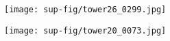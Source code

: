 \documentclass[10pt,twocolumn]{article}
\begin{document}
\begin{figure}[!hbtp]
    \centering
    \begin{subfigure}[b]{0.48\linewidth}
      \texttt{[image: sup-fig/tower26\_0299.jpg]}
     \end{subfigure}
     \GAP
         \begin{subfigure}[b]{0.48\linewidth}
      \texttt{[image: sup-fig/tower20\_0073.jpg]}
     \end{subfigure}
    \caption{\CAPOUR}
\end{figure} 
\end{document}
